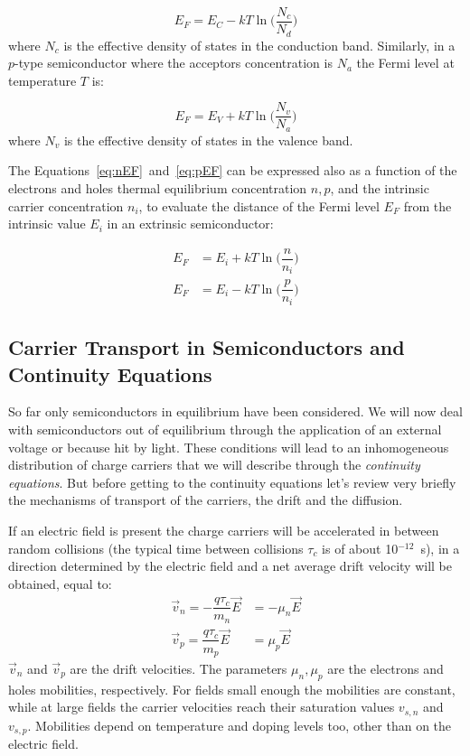 \begin{equation}
E_F=E_C-kT\ln\Big(\dfrac{N_c}{N_d}\Big)
\label{eq:nEF}
\end{equation}
where $N_c$ is the effective density of states in the conduction band. 
Similarly, in a $p$-type semiconductor where the acceptors concentration is $N_a$ the 
Fermi level at temperature $T$ is:

\begin{equation}
E_F=E_V+kT\ln\Big(\dfrac{N_v}{N_a}\Big)
\label{eq:pEF}
\end{equation}
where $N_v$ is the effective density of states in the valence band. 

The Equations~\ref{eq:nEF}~and~\ref{eq:pEF} can be expressed also as a function of the 
electrons and holes thermal equilibrium concentration $n,p$, and the intrinsic carrier concentration 
$n_i$, to evaluate  the distance of the Fermi level $E_F$ from the intrinsic value $E_i$ 
in an extrinsic semiconductor:

\begin{align}
E_F&=E_i+kT\ln\Big(\dfrac{n}{n_i}\Big)\label{eq:nEini}\\
E_F&=E_i-kT\ln\Big(\dfrac{p}{n_i}\Big)\label{eq:pEini}
\end{align} 




\subsection{Carrier Transport in Semiconductors and Continuity Equations}

So far only semiconductors in equilibrium have been considered. We will now deal with 
semiconductors out of equilibrium through the application of an external voltage or because 
hit by light. These conditions will lead to an inhomogeneous distribution of charge carriers that 
we will describe through the {\it continuity equations}. But before
 getting to the continuity equations let's 
review very briefly the mechanisms of transport of the 
carriers, the drift and the diffusion.

If an electric field is present the charge carriers will be accelerated in between random collisions  
(the typical time between collisions $\tau_c$ is of about 10$^{-12}$~s), 
in a direction determined by the electric field and a net average drift velocity will be obtained, 
equal to:
\begin{align}
\vec{v}_n=-\dfrac{q\tau_c}{m_n}\vec{E}&=-\mu_n\vec{E}\label{eq:nDrift}\\
\vec{v}_p=\dfrac{q\tau_c}{m_p}\vec{E}&=\mu_p\vec{E}\label{eq:pDrift}
\end{align}
$\vec{v}_n$ and $\vec{v}_p$ are the drift velocities.
The parameters $\mu_n,\mu_p$ are the electrons and holes mobilities, respectively. 
For fields small enough the mobilities are constant, while at large fields the carrier velocities 
reach their saturation values $v_{s,n}$ and $v_{s,p}$. Mobilities depend on temperature and 
doping levels too, other than on the electric field.

